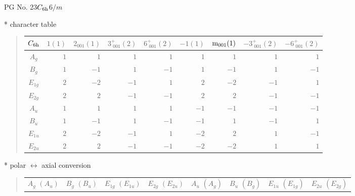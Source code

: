 \documentclass[fleqn,8pt,landscape]{jsarticle}
\begin{document}
\setcounter{MaxMatrixCols}{32}

\renewcommand{\tablename}{Table~}
\renewcommand{\figurename}{Figure~}
\begin{center}
\LARGE
PG No. 23\quad$C_{\rm 6h}$\quad$6/m$\quad[ hexagonal ]
\end{center}

* character table
\begin{quote}
\begin{tabular}{crrrrrrrr} \hline \hline
$ C_{\rm 6h} $ & $ 1(1) $ & $ 2{}_{001}(1) $ & $ 3^{+}_{\,\,001}(2) $ & $ 6^{+}_{\,\,001}(2) $ & $ -1(1) $ & $ {\rm m}_{001}(1) $ & $ -3^{+}_{\,\,001}(2) $ & $ -6^{+}_{\,\,001}(2) $ \\ \hline
$ A_{g} $ & $ 1 $ & $ 1 $ & $ 1 $ & $ 1 $ & $ 1 $ & $ 1 $ & $ 1 $ & $ 1 $ \\
$ B_{g} $ & $ 1 $ & $ -1 $ & $ 1 $ & $ -1 $ & $ 1 $ & $ -1 $ & $ 1 $ & $ -1 $ \\
$ E_{1g} $ & $ 2 $ & $ -2 $ & $ -1 $ & $ 1 $ & $ 2 $ & $ -2 $ & $ -1 $ & $ 1 $ \\
$ E_{2g} $ & $ 2 $ & $ 2 $ & $ -1 $ & $ -1 $ & $ 2 $ & $ 2 $ & $ -1 $ & $ -1 $ \\
$ A_{u} $ & $ 1 $ & $ 1 $ & $ 1 $ & $ 1 $ & $ -1 $ & $ -1 $ & $ -1 $ & $ -1 $ \\
$ B_{u} $ & $ 1 $ & $ -1 $ & $ 1 $ & $ -1 $ & $ -1 $ & $ 1 $ & $ -1 $ & $ 1 $ \\
$ E_{1u} $ & $ 2 $ & $ -2 $ & $ -1 $ & $ 1 $ & $ -2 $ & $ 2 $ & $ 1 $ & $ -1 $ \\
$ E_{2u} $ & $ 2 $ & $ 2 $ & $ -1 $ & $ -1 $ & $ -2 $ & $ -2 $ & $ 1 $ & $ 1 $ \\
 \hline \hline
\end{tabular}
\end{quote}

* polar $\leftrightarrow$ axial conversion
\begin{quote}
\begin{tabular}{cccccccc}
$ A_{g}\,\,(A_{u}) $ & $ B_{g}\,\,(B_{u}) $ & $ E_{1g}\,\,(E_{1u}) $ & $ E_{2g}\,\,(E_{2u}) $ & $ A_{u}\,\,(A_{g}) $ & $ B_{u}\,\,(B_{g}) $ & $ E_{1u}\,\,(E_{1g}) $ & $ E_{2u}\,\,(E_{2g}) $
\end{tabular}
\end{quote}
\end{document}
